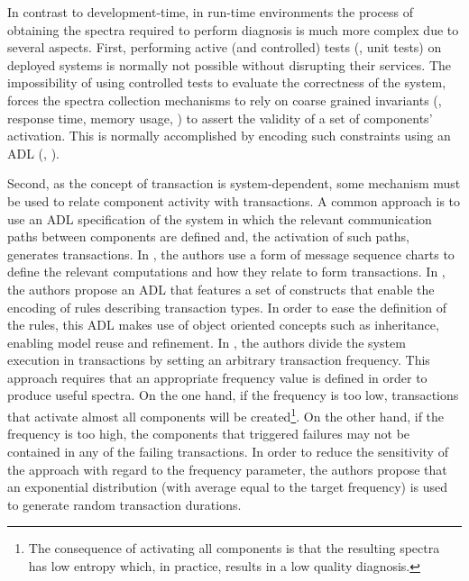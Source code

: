 In contrast to development-time, in run-time environments the process
of obtaining the spectra required to perform diagnosis is much more
complex due to several aspects.
%
First, performing active (and controlled) tests (\eg, unit tests) on
deployed systems is normally not possible without disrupting their
services.
%
The impossibility of using controlled tests to evaluate the
correctness of the system, forces the spectra collection mechanisms to
rely on coarse grained invariants (\eg, response time, memory usage,
\etc) to assert the validity of a set of components' activation.
%
This is normally accomplished by encoding such constraints using an
\ac{ADL} (\eg, \citep{Garlan00}).

Second, as the concept of transaction is system-dependent, some
mechanism must be used to relate component activity with transactions.
%
A common approach is to use an \ac{ADL} specification of the system in
which the relevant communication paths between components are defined
and, the activation of such paths, generates transactions.
%
In \citep{Casanova11}, the authors use a form of message sequence
charts to define the relevant computations and how they relate to form
transactions.
%
In \citep{Casanova13}, the authors propose an \ac{ADL} that
features a set of constructs that enable the encoding of rules
describing transaction types.
%
In order to ease the definition of the rules, this \ac{ADL} makes use
of object oriented concepts such as inheritance, enabling model reuse
and refinement.
%
In \citep{Piel12}, the authors divide the system execution in
transactions by setting an arbitrary transaction frequency.
%
This approach requires that an appropriate frequency value is
defined in order to produce useful spectra.
%
On the one hand, if the frequency is too low,
transactions that activate almost all components will be
created\footnote{The consequence of activating all components is that
  the resulting spectra has low entropy which, in practice, results in
  a low quality diagnosis.}.
%
On the other hand, if the frequency is too high, the components
that triggered failures may not be contained in any of the failing
transactions.
%
In order to reduce the sensitivity of the approach with regard to the
frequency parameter, the authors propose that an exponential
distribution (with average equal to the target frequency) is used to
generate random transaction durations.

